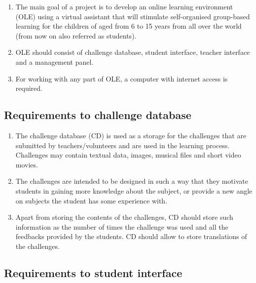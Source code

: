 \documentclass[a4paper]{article}
\begin{document}
\begin{enumerate}
\item The main goal of a project is to develop an online learning environment (OLE) using a virtual assistant that will stimulate self-organised group-based learning for the children of aged from 6 to 15 years from all over the world (from now on also referred as students).

\item OLE should consist of challenge database, student interface, teacher interface and a management panel.

\item For working with any part of OLE, a computer with internet access is required.
\end{enumerate}

\subsection{Requirements to challenge database}

\begin{enumerate}
\item The challenge database (CD) is used as a storage for the challenges that are submitted by teachers/volunteers and are used in the learning process. Challenges may contain textual data, images, musical files and short video movies.

\item The challenges are intended to be designed in such a way that they motivate students in gaining more knowledge about the subject, or provide a new angle on subjects the student has some experience with.

\item Apart from storing the contents of the challenges, CD should store such information as the number of times the challenge was used and all the feedbacks provided by the students. CD should allow to store translations of the challenges.
\end{enumerate}

\subsection{Requirements to student interface}
\end{document}
